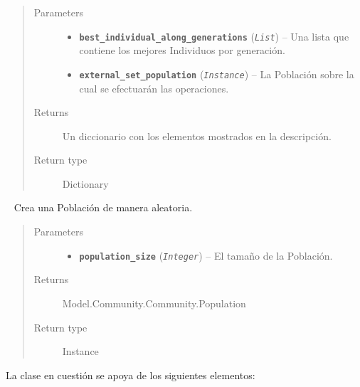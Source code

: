 \documentclass[class=report, crop=false]{standalone}
\begin{document}
\begin{fulllineitems}
\begin{fulllineitems}
\begin{quote}\begin{description}
\item[{Parameters}] \leavevmode\begin{itemize}
\item \textbf{\texttt{best\_individual\_along\_generations}} (\emph{\texttt{List}}) -- Una lista que contiene los mejores Individuos por generación.
\item \textbf{\texttt{external\_set\_population}} (\emph{\texttt{Instance}}) -- La Población sobre la cual se efectuarán las operaciones.
\end{itemize}
\item[{Returns}] \leavevmode
Un diccionario con los elementos mostrados en la descripción.
\item[{Return type}] \leavevmode
Dictionary
\end{description}\end{quote}

\end{fulllineitems}

\begin{fulllineitems}
~
\vspace{-0.1cm}
Crea una Población de manera aleatoria.

\begin{quote}\begin{description}
\item[{Parameters}] \leavevmode\begin{itemize}
\item \textbf{\texttt{population\_size}} (\emph{\texttt{Integer}}) -- El tamaño de la Población.
\end{itemize}
\item[{Returns}] \leavevmode
Model.Community.Community.Population
\item[{Return type}] \leavevmode
Instance
\end{description}\end{quote}

\end{fulllineitems}
\end{fulllineitems}

La clase en cuestión se apoya de los siguientes 
elementos:

\end{document}

